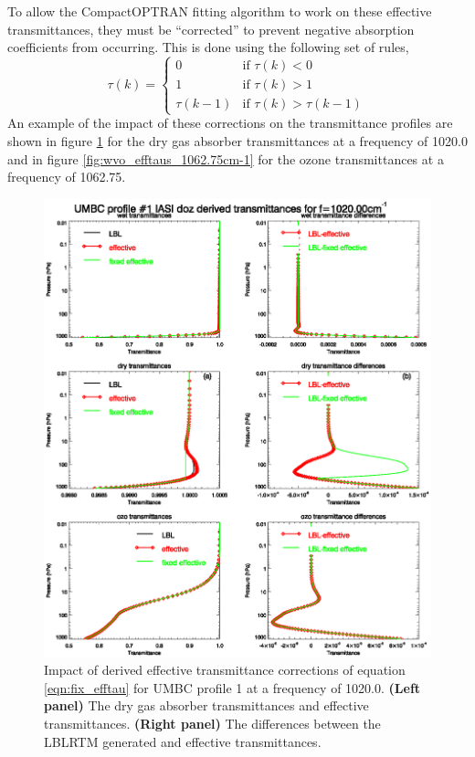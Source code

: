 To allow the CompactOPTRAN fitting algorithm to work on these effective transmittances, they must be ``corrected'' to prevent negative absorption coefficients from occurring. This is done using the following set of rules,
\begin{equation}
  \tau(k) = \begin{cases}
               0         & \textrm{if } \tau(k) < 0\\
               1         & \textrm{if } \tau(k) > 1\\
               \tau(k-1) & \textrm{if } \tau(k) > \tau(k-1)
            \end{cases}
  \label{eqn:fix_efftau}
\end{equation}
An example of the impact of these corrections on the transmittance profiles are shown in figure \ref{fig:wvo_efftaus_1020.0cm-1} for the dry gas absorber transmittances at a frequency of 1020.0\invcm{} and in figure \ref{fig:wvo_efftaus_1062.75cm-1} for the ozone transmittances at a frequency of 1062.75\invcm.
\begin{figure}[htp]
  \centering
  \includegraphics[bb=70 300 540 480,clip,scale=0.8]{graphics/wvo_efftaus_1020.0cm-1.eps}
  \caption{Impact of  derived effective transmittance corrections of equation \ref{eqn:fix_efftau} for UMBC profile 1 at a frequency of 1020.0\invcm. \textbf{(Left panel)} The dry gas absorber transmittances and effective transmittances. \textbf{(Right panel)} The differences between the LBLRTM generated and effective transmittances.}
  \label{fig:wvo_efftaus_1020.0cm-1}
\end{figure}
